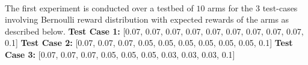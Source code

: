%

\paragraph{}The first experiment is conducted over a testbed of $10$ arms for the 3 test-cases involving Bernoulli reward distribution with expected rewards of the arms as described below.
\newline
\hspace*{3em}\textbf{Test Case 1:} [0.07, 0.07, 0.07, 0.07, 0.07, 0.07, 0.07, 0.07, 0.07, 0.1]
\newline
\hspace*{3em}\textbf{Test Case 2:} [0.07, 0.07, 0.07, 0.05, 0.05, 0.05, 0.05, 0.05, 0.05, 0.1]
\newline
\hspace*{3em}\textbf{Test Case 3:} [0.07, 0.07, 0.07, 0.05, 0.05, 0.05, 0.03, 0.03, 0.03, 0.1]


